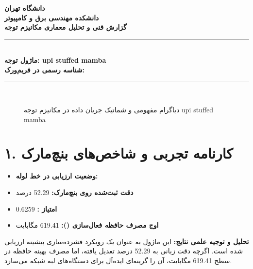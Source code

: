 \documentclass[12pt,a4paper]{article}
\begin{document}
\begin{center}
{\Large\bfseries دانشگاه تهران}\\[0.2cm]
{\large\bfseries دانشکده مهندسی برق و کامپیوتر}\\[0.2cm]
{\large\bfseries گزارش فنی و تحلیل معماری مکانیزم توجه}\\[0.5cm]
\rule{\linewidth}{1pt}\\[0.3cm]
{\LARGE\bfseries ماژول توجه: upi stuffed mamba}\\[0.2cm]
{\large \textbf{شناسه رسمی در فریم‌ورک:} }\\[0.2cm]
\rule{\linewidth}{1pt}\\[0.5cm]
\end{center}

\begin{figure}[H]
\centering
{}
\caption{دیاگرام مفهومی و شماتیک جریان داده در مکانیزم توجه upi stuffed mamba}
\end{figure}

\section*{۱. کارنامه تجربی و شاخص‌های بنچ‌مارک}
\begin{itemize}
\item \textbf{وضعیت ارزیابی در خط لوله:} 
\item \textbf{دقت ثبت‌شده روی بنچ‌مارک:} 52.29 درصد
\item \textbf{امتیاز :} 0.6259
\item \textbf{اوج مصرف حافظه فعال‌سازی ():} 619.41 مگابایت
\end{itemize}
\textbf{تحلیل و توجیه علمی نتایج:} این ماژول به عنوان یک رویکرد فشرده‌سازی بیشینه ارزیابی شده است. اگرچه دقت زبانی به 52.29 درصد تعدیل یافته، اما مصرف بهینه حافظه در سطح 619.41 مگابایت، آن را گزینه‌ای ایده‌آل برای دستگاه‌های لبه شبکه می‌سازد.
\end{document}
